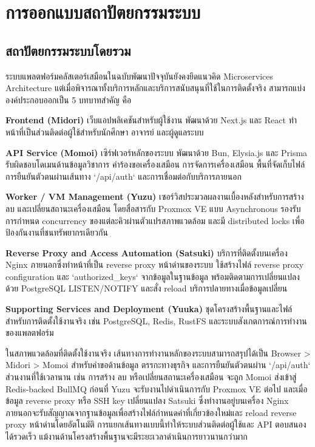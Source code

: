 
\section{การออกแบบสถาปัตยกรรมระบบ}

\subsection{สถาปัตยกรรมระบบโดยรวม}

\hspace*{1.3em} %
ระบบแพลตฟอร์มคลัสเตอร์เสมือนในฉบับพัฒนาปัจจุบันยังคงยึดแนวคิด Microservices Architecture แต่เมื่อพิจารณาทั้งบริการหลักและบริการสนับสนุนที่ใช้ในการติดตั้งจริง สามารถแบ่งองค์ประกอบออกเป็น 5 บทบาทสำคัญ คือ
\begin{mycustomitem}
    \item \textbf{Frontend (Midori)} เว็บแอปพลิเคชันสำหรับผู้ใช้งาน พัฒนาด้วย Next.js และ React ทำหน้าที่เป็นส่วนติดต่อผู้ใช้สำหรับนักศึกษา อาจารย์ และผู้ดูแลระบบ
    \item \textbf{API Service (Momoi)} เซิร์ฟเวอร์หลักของระบบ พัฒนาด้วย Bun, Elysia.js และ Prisma รับผิดชอบโดเมนด้านข้อมูลวิชาการ คำร้องขอเครื่องเสมือน การจัดการเครื่องเสมือน พื้นที่จัดเก็บไฟล์ การยืนยันตัวตนผ่านเส้นทาง `/api/auth` และการเชื่อมต่อกับบริการภายนอก
    \item \textbf{Worker / VM Management (Yuzu)} เซอร์วิสประมวลผลงานเบื้องหลังสำหรับการสร้าง ลบ และเปลี่ยนสถานะเครื่องเสมือน โดยสื่อสารกับ Proxmox VE แบบ Asynchronous รองรับการกำหนด concurrency ของแต่ละคิวผ่านตัวแปรสภาพแวดล้อม และมี distributed locks เพื่อป้องกันงานที่ชนทรัพยากรเดียวกัน
    \item \textbf{Reverse Proxy and Access Automation (Satsuki)} บริการที่ติดตั้งบนเครื่อง Nginx ภายนอกซึ่งทำหน้าที่เป็น reverse proxy หน้าด่านของระบบ ใช้สร้างไฟล์ reverse proxy configuration และ `authorized\_keys` จากข้อมูลในฐานข้อมูล พร้อมติดตามการเปลี่ยนแปลงด้วย PostgreSQL LISTEN/NOTIFY และสั่ง reload บริการปลายทางเมื่อข้อมูลเปลี่ยน
    \item \textbf{Supporting Services and Deployment (Yuuka)} ชุดโครงสร้างพื้นฐานและไฟล์สำหรับการติดตั้งใช้งานจริง เช่น PostgreSQL, Redis, RustFS และระบบสังเกตการณ์การทำงานของแพลตฟอร์ม
\end{mycustomitem}

\hspace*{1.3em} %
ในสภาพแวดล้อมที่ติดตั้งใช้งานจริง เส้นทางการทำงานหลักของระบบสามารถสรุปได้เป็น Browser > Midori > Momoi สำหรับคำขอด้านข้อมูล ตรรกะทางธุรกิจ และการยืนยันตัวตนผ่าน `/api/auth` ส่วนงานที่ใช้เวลานาน เช่น การสร้าง ลบ หรือเปลี่ยนสถานะเครื่องเสมือน จะถูก Momoi ส่งเข้าสู่ Redis-backed BullMQ ก่อนที่ Yuzu จะรับงานไปดำเนินการกับ Proxmox VE ต่อไป และเมื่อข้อมูล reverse proxy หรือ SSH key เปลี่ยนแปลง Satsuki ซึ่งทำงานอยู่บนเครื่อง Nginx ภายนอกจะรับสัญญาณจากฐานข้อมูลเพื่อสร้างไฟล์กำหนดค่าที่เกี่ยวข้องใหม่และ reload reverse proxy หน้าด่านโดยอัตโนมัติ การแยกเส้นทางแบบนี้ทำให้ระบบส่วนติดต่อผู้ใช้และ API ตอบสนองได้รวดเร็ว แม้งานด้านโครงสร้างพื้นฐานจะมีระยะเวลาดำเนินการยาวนานกว่ามาก

